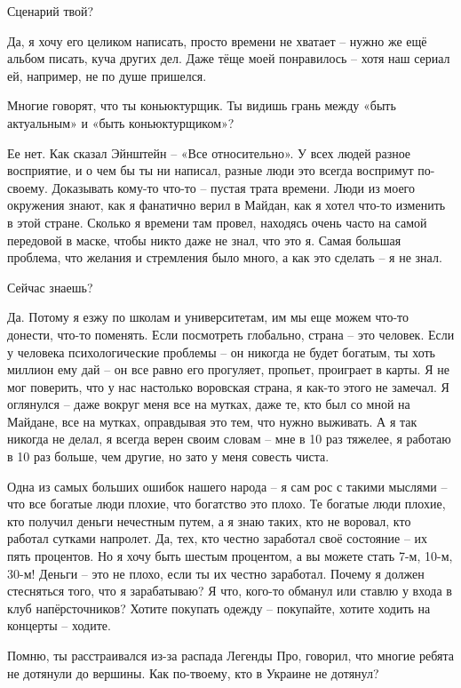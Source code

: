 Сценарий твой?

Да, я хочу его целиком написать, просто времени не хватает – нужно же ещё
альбом писать, куча других дел. Даже тёще моей понравилось – хотя наш сериал
ей, например, не по душе пришелся.

Многие говорят, что ты коньюктурщик. Ты видишь грань между «быть актуальным» и
«быть коньюктурщиком»?

Ее нет. Как сказал Эйнштейн – «Все относительно». У всех людей разное
восприятие, и о чем бы ты ни написал, разные люди это всегда воспримут
по-своему. Доказывать кому-то что-то – пустая трата времени. Люди из моего
окружения знают, как я фанатично верил в Майдан, как я хотел что-то изменить в
этой стране. Сколько я времени там провел, находясь очень часто на самой
передовой в маске, чтобы никто даже не знал, что это я. Самая большая проблема,
что желания и стремления было много, а как это сделать – я не знал.

Сейчас знаешь?

Да. Потому я езжу по школам и университетам, им мы еще можем что-то донести,
что-то поменять. Если посмотреть глобально, страна – это человек. Если у
человека психологические проблемы – он никогда не будет богатым, ты хоть
миллион ему дай – он все равно его прогуляет, пропьет, проиграет в карты. Я не
мог поверить, что у нас настолько воровская страна, я как-то этого не замечал.
Я оглянулся – даже вокруг меня все на мутках, даже те, кто был со мной на
Майдане, все на мутках, оправдывая это тем, что нужно выживать. А я так никогда
не делал, я всегда верен своим словам – мне в 10 раз тяжелее, я работаю в 10
раз больше, чем другие, но зато у меня совесть чиста. 

Одна из самых больших ошибок нашего народа – я сам рос с такими мыслями – что
все богатые люди плохие, что богатство это плохо. Те богатые люди плохие, кто
получил деньги нечестным путем, а я знаю таких, кто не воровал, кто работал
сутками напролет. Да, тех, кто честно заработал своё состояние – их пять
процентов. Но я хочу быть шестым процентом, а вы можете стать 7-м, 10-м, 30-м!
Деньги – это не плохо, если ты их честно заработал. Почему я должен стесняться
того, что я зарабатываю? Я что, кого-то обманул или ставлю у входа в клуб
напёрсточников? Хотите покупать одежду – покупайте, хотите ходить на концерты –
ходите.

Помню, ты расстраивался из-за распада Легенды Про, говорил, что многие ребята
не дотянули до вершины. Как по-твоему, кто в Украине не дотянул?

